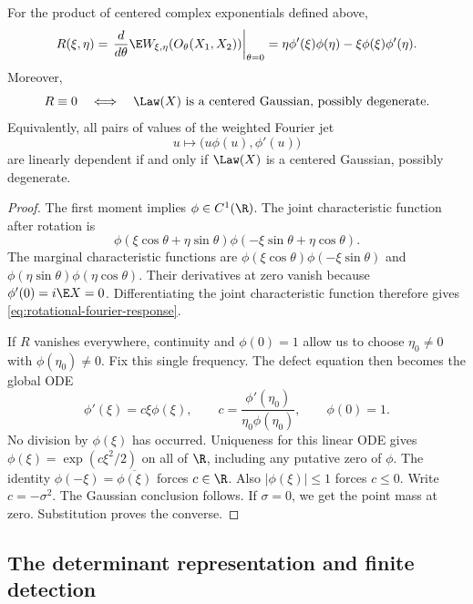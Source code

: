 \begin{lemma}
\label{lem:fourier-ode}
For the product of centered complex exponentials defined above,
\begin{equation}
 R(\xi,\eta)
 =\left.\frac{d}{d\theta}
       \E W_{\xi,\eta}(O_\theta(X_1,X_2))\right|_{\theta=0}
   =\eta\phi'(\xi)\phi(\eta)
          -\xi\phi(\xi)\phi'(\eta).
 \label{eq:rotational-fourier-response}
\end{equation}
Moreover,
\begin{equation}
 R\equiv0
 \quad\Longleftrightarrow\quad
 \Law(X)\text{ is a centered Gaussian, possibly degenerate}.
 \label{eq:fourier-gaussian-characterization}
\end{equation}
Equivalently, all pairs of values of the weighted Fourier jet
\[
 u\longmapsto\bigl(u\phi(u),\phi'(u)\bigr)
\]
are linearly dependent if and only if \(\Law(X)\) is a centered Gaussian,
possibly degenerate.
\end{lemma}
\begin{proof}
The first moment implies $\phi\in C^1(\R)$.
The joint characteristic function after rotation is
\[
 \phi(\xi\cos\theta+\eta\sin\theta)
 \phi(-\xi\sin\theta+\eta\cos\theta).
\]
The marginal characteristic functions are
$\phi(\xi\cos\theta)\phi(-\xi\sin\theta)$ and
$\phi(\eta\sin\theta)\phi(\eta\cos\theta)$.
Their derivatives at zero vanish because $\phi'(0)=i\E X=0$.
Differentiating the joint characteristic function therefore gives
\eqref{eq:rotational-fourier-response}.

If $R$ vanishes everywhere, continuity and $\phi(0)=1$ allow us to
choose $\eta_0\ne0$ with $\phi(\eta_0)\ne0$.
Fix this single frequency.
The defect equation then becomes the global ODE
\[
 \phi'(\xi)=c\xi\phi(\xi),\qquad
 c=\frac{\phi'(\eta_0)}{\eta_0\phi(\eta_0)},\qquad
 \phi(0)=1.
\]
No division by $\phi(\xi)$ has occurred.
Uniqueness for this linear ODE gives $\phi(\xi)=\exp(c\xi^2/2)$ on all of
$\R$, including any putative zero of $\phi$.
The identity $\phi(-\xi)=\overline{\phi(\xi)}$ forces $c\in\R$.
Also $|\phi(\xi)|\le1$ forces $c\le0$.
Write $c=-\sigma^2$.
The Gaussian conclusion follows.
If $\sigma=0$, we get the point mass at zero.
Substitution proves the converse.
\end{proof}

\subsection{The determinant representation and finite detection}
\label{sec:fourier-determinant}

